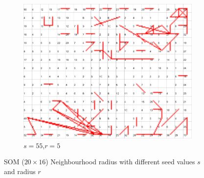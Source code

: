 \documentclass{acm_proc_article-sp}
\begin{document}
\begin{figure}
    \begin{subfigure}[b]{0.30\linewidth}
        \includegraphics[width=\linewidth]{img/wine-newmid-radius-neighbourhood-graph--r-05-seed-55}
        \caption{$s=55$,$r=5$}
    \end{subfigure}
    \caption{SOM ($20\times16$) Neighbourhood radius with different seed values $s$ and radius $r$}
    \label{fig:wine-newmid-radius-neighbourhood-graph--r-05-seed}
\end{figure}
\end{document}
